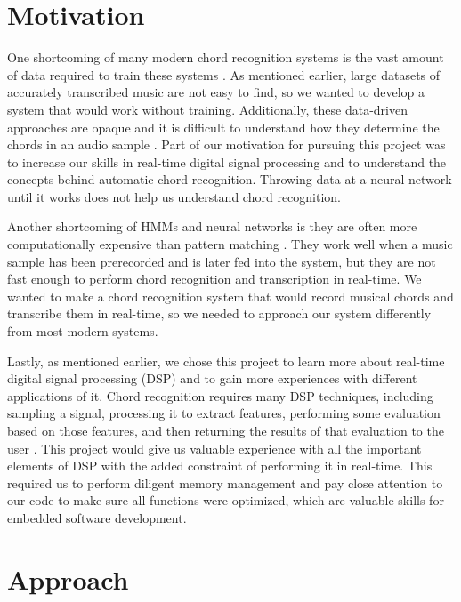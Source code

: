 \documentclass[journal]{IEEEtran}
\begin{document}
\section{Motivation}
One shortcoming of many modern chord recognition systems is the vast amount of data required to train these systems \cite{pauwels}.
As mentioned earlier, large datasets of accurately transcribed music are not easy to find, so we wanted to develop a system that would work without training.
Additionally, these data-driven approaches are opaque and it is difficult to understand how they determine the chords in an audio sample \cite{pauwels}.
Part of our motivation for pursuing this project was to increase our skills in real-time digital signal processing and to understand the concepts behind automatic chord recognition.
Throwing data at a neural network until it works does not help us understand chord recognition.

Another shortcoming of HMMs and neural networks is they are often more computationally expensive than pattern matching \cite{stark}.
They work well when a music sample has been prerecorded and is later fed into the system, but they are not fast enough to perform chord recognition and transcription in real-time.
We wanted to make a chord recognition system that would record musical chords and transcribe them in real-time, so we needed to approach our system differently from most modern systems.

Lastly, as mentioned earlier, we chose this project to learn more about real-time digital signal processing (DSP) and to gain more experiences with different applications of it.
Chord recognition requires many DSP techniques, including sampling a signal, processing it to extract features, performing some evaluation based on those features, and then returning the results of that evaluation to the user \cite{fujishima}.
This project would give us valuable experience with all the important elements of DSP with the added constraint of performing it in real-time.
This required us to perform diligent memory management and pay close attention to our code to make sure all functions were optimized, which are valuable skills for embedded software development.


\section{Approach}
\end{document}
